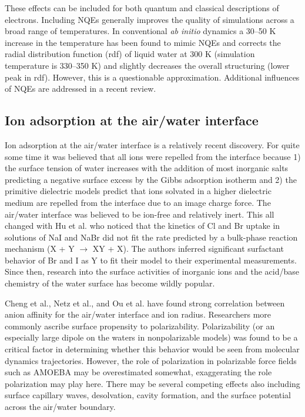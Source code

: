 \begin{intro}
   These effects can be included for both quantum and classical descriptions of electrons. Including NQEs generally improves the quality of simulations across a broad range of 
   temperatures\cite{vega2010heat}. In conventional \emph{ab initio} dynamics a 30--50 K increase in the temperature has been found to mimic NQEs and corrects the radial 
   distribution function (rdf) of liquid water at 300 K (simulation temperature is 330--350 K) and slightly decreases the overall structuring (lower peak in 
   rdf)\cite{morrone2008nuclear}. However, this is a questionable approximation\cite{weber2010communication}. Additional influences of NQEs are addressed in a recent
   review\cite{ceriotti2016nuclear}.

  \subsection{\label{ch1:sec3:level5}Ion adsorption at the air/water interface}
   Ion adsorption at the air/water interface is a relatively recent discovery. For quite some time it was believed that all ions were repelled from the interface because 1)
   the surface tension of water increases with the addition of most inorganic salts predicting a negative surface excess by the Gibbs adsorption isotherm and 2) the primitive
   dielectric models predict that ions solvated in a higher dielectric medium are repelled from the interface due to an image charge force. The air/water interface was believed 
   to be ion-free and relatively inert\cite{ishiyama2014theoretical,jungwirth2006airwat}. This all changed with Hu et al.\cite{hu1995reactive} who noticed that the kinetics of Cl and 
   Br uptake in solutions of NaI and NaBr did not fit the rate predicted by a bulk-phase reaction mechanism (X + Y\sur{-} $\rightarrow$ XY + X\sur{-}). The 
   authors inferred significant surfactant behavior of Br\sur{-} and I\sur{-} as Y\sur{-} to fit their model to their experimental measurements. Since then, research into the 
   surface activities of inorganic ions and the acid/base chemistry of the water surface has become wildly popular.
   
   Cheng et al., Netz et al., and Ou et al. have found strong correlation between anion affinity for the air/water interface and ion radius\cite{cheng2006experimental,netz2009ionsinterfaces,ou2016molecular}. 
   Researchers more commonly ascribe surface propensity to 
   polarizability\cite{jungwirth2002airwat,jungwirth2006airwat,pegram2006partitioning,pegram2007hofmeister,petersen2005adsorption,petersen2006nature,wick2007effect}.
   Polarizability (or an especially large dipole on the waters in nonpolarizable models) was found to be a critical factor in determining whether this behavior would be seen
   from molecular dynamics trajectories\cite{stuart1996effects}. However, the role of polarization in polarizable force fields such as AMOEBA may be overestimated somewhat, 
   exaggerating the role polarization may play here\cite{rogers2010ctpolar}. There may be several competing effects also including surface capillary waves, desolvation, cavity 
   formation, and the surface potential across the air/water boundary\cite{ayse2012,ben2016interfaces,rane2016understanding}. 
   

\end{intro}
